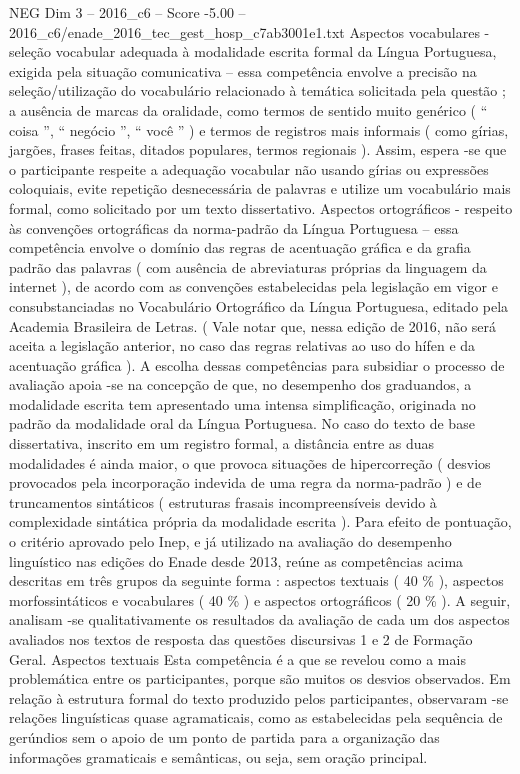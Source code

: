 \begin{textsample}{NEG Dim 3 – 2016\_c6 – Score -5.00 – 2016\_c6/enade\_2016\_tec\_gest\_hosp\_c7ab3001e1.txt}
Aspectos vocabulares - seleção vocabular adequada à modalidade escrita formal da Língua Portuguesa, exigida pela situação comunicativa – essa competência envolve a precisão na seleção/utilização do vocabulário relacionado à temática solicitada pela questão ; a ausência de marcas da oralidade, como termos de sentido muito genérico ( “ coisa ”, “ negócio ”, “ você ” ) e termos de registros mais informais ( como gírias, jargões, frases feitas, ditados populares, termos regionais ).
Assim, espera -se que o participante respeite a adequação vocabular não usando gírias ou expressões coloquiais, evite repetição desnecessária de palavras e utilize um vocabulário mais formal, como solicitado por um texto dissertativo.
Aspectos ortográficos - respeito às convenções ortográficas da norma-padrão da Língua Portuguesa – essa competência envolve o domínio das regras de acentuação gráfica e da grafia padrão das palavras ( com ausência de abreviaturas próprias da linguagem da internet ), de acordo com as convenções estabelecidas pela legislação em vigor e consubstanciadas no Vocabulário Ortográfico da Língua Portuguesa, editado pela Academia Brasileira de Letras. ( Vale notar que, nessa edição de 2016, não será aceita a legislação anterior, no caso das regras relativas ao uso do hífen e da acentuação gráfica ).
A escolha dessas competências para subsidiar o processo de avaliação apoia -se na concepção de que, no desempenho dos graduandos, a modalidade escrita tem apresentado uma intensa simplificação, originada no padrão da modalidade oral da Língua Portuguesa.
No caso do texto de base dissertativa, inscrito em um registro formal, a distância entre as duas modalidades é ainda maior, o que provoca situações de hipercorreção ( desvios provocados pela incorporação indevida de uma regra da norma-padrão ) e de truncamentos sintáticos ( estruturas frasais incompreensíveis devido à complexidade sintática própria da modalidade escrita ).
Para efeito de pontuação, o critério aprovado pelo Inep, e já utilizado na avaliação do desempenho linguístico nas edições do Enade desde 2013, reúne as competências acima descritas em três grupos da seguinte forma : aspectos textuais ( 40 \% ), aspectos morfossintáticos e vocabulares ( 40 \% ) e aspectos ortográficos ( 20 \% ).
A seguir, analisam -se qualitativamente os resultados da avaliação de cada um dos aspectos avaliados nos textos de resposta das questões discursivas 1 e 2 de Formação Geral.
Aspectos textuais Esta competência é a que se revelou como a mais problemática entre os participantes, porque são muitos os desvios observados.
Em relação à estrutura formal do texto produzido pelos participantes, observaram -se relações linguísticas quase agramaticais, como as estabelecidas pela sequência de gerúndios sem o apoio de um ponto de partida para a organização das informações gramaticais e semânticas, ou seja, sem oração principal.

\end{textsample}
